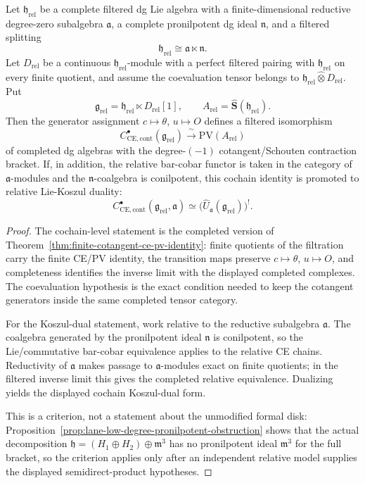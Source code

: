 \begin{thm}\label{thm:relative-filtered-koszul-lift}
  Let \(\mathfrak h_{\mathrm{rel}}\) be a complete filtered dg Lie algebra
  with a finite-dimensional reductive degree-zero subalgebra
  \(\mathfrak a\), a complete pronilpotent dg ideal \(\mathfrak n\), and
  a filtered splitting
  \[
    \mathfrak h_{\mathrm{rel}}\cong\mathfrak a\ltimes\mathfrak n .
  \]
  Let \(D_{\mathrm{rel}}\) be a continuous \(\mathfrak h_{\mathrm{rel}}\)-module
  with a perfect filtered pairing with \(\mathfrak h_{\mathrm{rel}}\) on
  every finite quotient, and assume the coevaluation tensor belongs to
  \(\mathfrak h_{\mathrm{rel}}\widehat\otimes D_{\mathrm{rel}}\).  Put
  \[
    \mathfrak g_{\mathrm{rel}}
      =\mathfrak h_{\mathrm{rel}}\ltimes D_{\mathrm{rel}}[1],
    \qquad
    A_{\mathrm{rel}}=\widehat{\mathbf S}(\mathfrak h_{\mathrm{rel}}).
  \]
  Then the generator assignment \(c\mapsto\theta\), \(u\mapsto O\)
  defines a filtered isomorphism
  \[
    C^\bullet_{\mathrm{CE},\mathrm{cont}}(\mathfrak g_{\mathrm{rel}})
    \xrightarrow{\ \sim\ }
    \mathrm{PV}(A_{\mathrm{rel}})
  \]
  of completed dg algebras with the degree-\((-1)\)
  cotangent/Schouten contraction bracket.  If, in addition, the relative
  bar-cobar functor is taken in the category of
  \(\mathfrak a\)-modules and the \(\mathfrak n\)-coalgebra is
  conilpotent, this cochain identity is promoted to relative
  Lie-Koszul duality:
  \[
    C^\bullet_{\mathrm{CE},\mathrm{cont}}(\mathfrak g_{\mathrm{rel}},\mathfrak a)
    \simeq
    \bigl(\widehat U_{\mathfrak a}(\mathfrak g_{\mathrm{rel}})\bigr)^!.
  \]
\end{thm}

\begin{proof}
  The cochain-level statement is the completed version of
  Theorem~\ref{thm:finite-cotangent-ce-pv-identity}: finite quotients of
  the filtration carry the finite CE/PV identity, the transition maps
  preserve \(c\mapsto\theta\), \(u\mapsto O\), and completeness identifies
  the inverse limit with the displayed completed complexes.  The
  coevaluation hypothesis is the exact condition needed to keep the
  cotangent generators inside the same completed tensor category.

  For the Koszul-dual statement, work relative to the reductive
  subalgebra \(\mathfrak a\).  The coalgebra generated by the
  pronilpotent ideal \(\mathfrak n\) is conilpotent, so the
  Lie/commutative bar-cobar equivalence applies to the relative CE
  chains.  Reductivity of \(\mathfrak a\) makes passage to
  \(\mathfrak a\)-modules exact on finite quotients; in the filtered
  inverse limit this gives the completed relative equivalence.  Dualizing
  yields the displayed cochain Koszul-dual form.

  This is a criterion, not a statement about the unmodified formal disk:
  Proposition~\ref{prop:lane-low-degree-pronilpotent-obstruction} shows
  that the actual decomposition
  \(\mathfrak h=(H_1\oplus H_2)\oplus\mathfrak m^3\) has no
  pronilpotent ideal \(\mathfrak m^3\) for the full bracket, so the
  criterion applies only after an independent relative model supplies the
  displayed semidirect-product hypotheses.
\end{proof}

